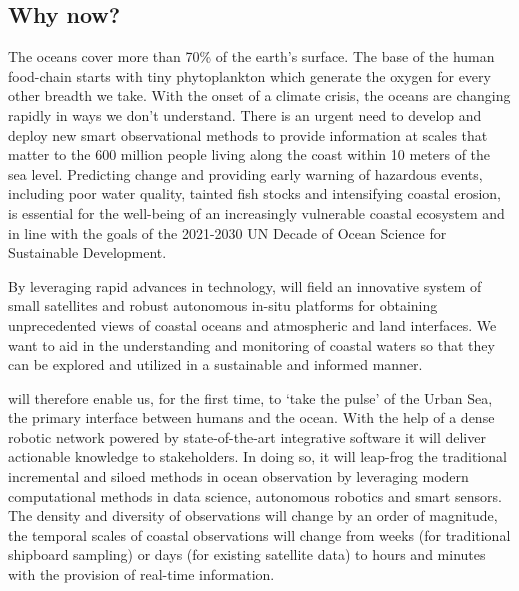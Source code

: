 \documentclass[12pt]{article}
\begin{document}


\subsection{Why now?}

The oceans cover more than 70\% of the earth's surface. The base of the
human food-chain starts with tiny phytoplankton which generate the
oxygen for every other breadth we take.  With the onset of a climate
crisis, the oceans are changing rapidly in ways we don't
understand. There is an urgent need to develop and deploy new smart
observational methods to provide information at scales that matter to
the 600 million people living along the coast within 10 meters of the
sea level.  Predicting change and providing early warning of hazardous
events, including poor water quality, tainted fish stocks and
intensifying coastal erosion, is essential for the well-being of an
increasingly vulnerable coastal ecosystem and in line with the goals
of the 2021-2030 UN Decade of Ocean Science for Sustainable
Development.

By leveraging rapid advances in technology, \pro will field an
innovative system of small satellites and robust autonomous in-situ
platforms for obtaining unprecedented views of coastal oceans and
atmospheric and land interfaces. We want to aid in the understanding
and monitoring of coastal waters so that they can be explored and
utilized in a sustainable and informed manner.

\pro will therefore enable us, for the first time, to ‘take the pulse’
of the Urban Sea, the primary interface between humans and the
ocean. With the help of a dense robotic network powered by
state-of-the-art integrative software it will deliver actionable
knowledge to stakeholders. In doing so, it will leap-frog the
traditional incremental and siloed methods in ocean observation by
leveraging modern computational methods in data science, autonomous
robotics and smart sensors. The density and diversity of observations
will change by an order of magnitude, the temporal scales of coastal
observations will change from weeks (for traditional shipboard
sampling) or days (for existing satellite data) to hours and minutes
with the provision of real-time information.
\end{document}
